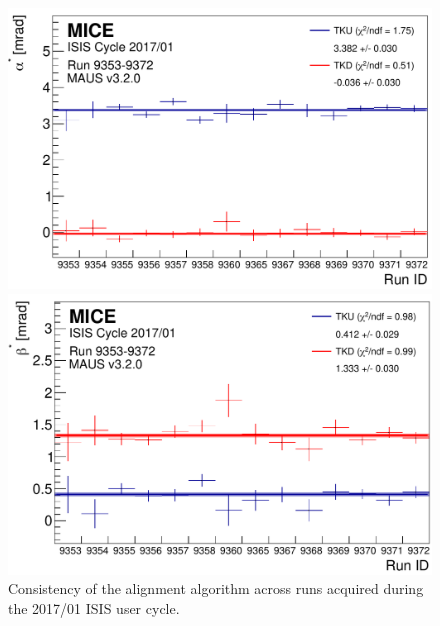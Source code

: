 \begin{figure}
\begin{center}
\begin{minipage}[b]{.45\textwidth}
\begin{center}
        \includegraphics[width=\textwidth]{data_final/alpha_bestfit_edit.pdf}
      \end{center}
    \end{minipage}
    \hfill
    \begin{minipage}[b]{.45\textwidth}
      \begin{center}
        \includegraphics[width=\textwidth]{data_final/beta_bestfit_edit.pdf}
      \end{center}
    \end{minipage}
  \end{center}
  \caption{
    Consistency of the alignment algorithm across runs acquired during
    the 2017/01 ISIS user cycle.
  }
  \label{fig:runtorun}
\end{figure}
